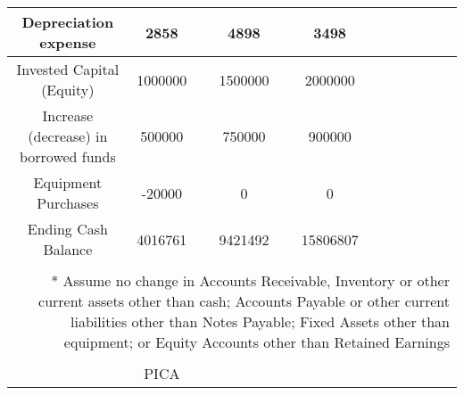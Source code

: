 {\begin{longtable}[c]{|c|c|c|c|c|c|c|c|c|c|c|c|}
\hline
Depreciation expense                                                                                                            & 2858                              &  & 4898         &  & 3498      &  &           &  &           &  &           \\
\hline
Invested Capital (Equity)                                                                                                       & 1000000                           &  & 1500000      &  & 2000000   &  &           &  &           &  &           \\
\hline
Increase (decrease) in borrowed funds                                                                                           & 500000                            &  & 750000       &  & 900000    &  &           &  &           &  &           \\
\hline
Equipment Purchases                                                                                                             & -20000                            &  & 0            &  & 0         &  &           &  &           &  &           \\
\hline
Ending Cash Balance                                                                                                             & 4016761                           &  & 9421492      &  & 15806807  &  &           &  &           &  &           \\
\hline
                                                                                                                                &                                   &  &              &  &           &  &           &  &           &  &           \\
\hline
\multicolumn{12}{r}{* Assume no change in Accounts Receivable, Inventory or other current assets other than cash; Accounts Payable or other current liabilities other than Notes Payable; Fixed Assets other than equipment; or Equity Accounts other than Retained Earnings } \\
                                                                                                                                &                                   &  &              &  &           &  &           &  &           &  &           \\
\hline
                                                                                                                                & PICA                              &  &              &  &           &  &           &  &           &  &           \\

\end{longtable}}
